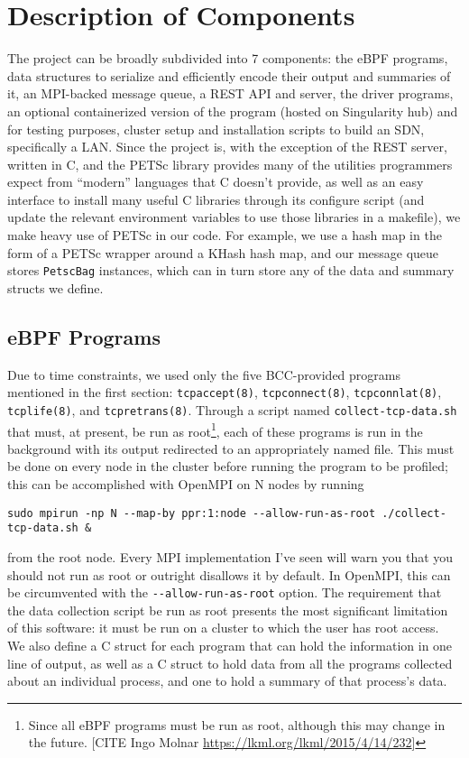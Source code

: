 \documentclass[11pt]{article}
\begin{document}
\section{Description of Components}

The project can be broadly subdivided into 7 components: the eBPF programs, data structures to serialize and efficiently encode their output and summaries of it, an MPI-backed message queue, a REST API and server, the driver programs, an optional containerized version of the program (hosted on Singularity hub) and for testing purposes, cluster setup and installation scripts to build an SDN, specifically a LAN. Since the project is, with the exception of the REST server, written in C, and the PETSc library provides many of the utilities programmers expect from ``modern'' languages that C doesn't provide, as well as an easy interface to install many useful C libraries through its configure script (and update the relevant environment variables to use those libraries in a makefile), we make heavy use of PETSc in our code. For example, we use a hash map in the form of a PETSc wrapper around a KHash hash map, and our message queue stores \lstinline{PetscBag} instances, which can in turn store any of the data and summary structs we define.
\subsection*{eBPF Programs}
Due to time constraints, we used only the five BCC-provided programs mentioned in the first section: \lstinline{tcpaccept(8)}, \lstinline{tcpconnect(8)}, \lstinline{tcpconnlat(8)}, \lstinline{tcplife(8)}, and \lstinline{tcpretrans(8)}. Through a script named \lstinline{collect-tcp-data.sh} that must, at present, be run as root\footnote{Since all eBPF programs must be run as root, although this may change in the future. [CITE Ingo Molnar \url{https://lkml.org/lkml/2015/4/14/232}]}, each of these programs is run in the background with its output redirected to an appropriately named file. This must be done on every node in the cluster before running the program to be profiled; this can be accomplished with OpenMPI on N nodes by running
\begin{Verbatim}
sudo mpirun -np N --map-by ppr:1:node --allow-run-as-root ./collect-tcp-data.sh &
\end{Verbatim}
from the root node. Every MPI implementation I've seen will warn you that you should not run as root or outright disallows it by default. In OpenMPI, this can be circumvented with the \lstinline{--allow-run-as-root} option. The requirement that the data collection script be run as root presents the most significant limitation of this software: it must be run on a cluster to which the user has root access. \\
We also define a C struct for each program that can hold the information in one line of output, as well as a C struct to hold data from all the programs collected about an individual process, and one to hold a summary of that process's data.
\end{document}
